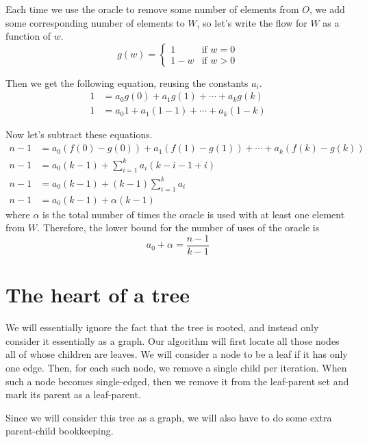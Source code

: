 \documentclass{article}
\begin{document}
\begin{description}
        Each time we use the oracle to remove some number of elements from $O$,
        we add some corresponding number of elements to $W$, so let's write the
        flow for $W$ as a function of $w$.
        $$
        g(w) = \begin{cases}
            1 & \text{if } w = 0 \\
            1 - w & \text{if } w > 0
        \end{cases}
        $$

        Then we get the following equation, reusing the constants $a_i$.
        \begin{align*}
            1 &= a_0 g(0) + a_1 g(1) + \cdots + a_k g(k) \\
            1 &= a_0 1 + a_1 (1 - 1) + \cdots + a_k (1 - k)
        \end{align*}

        Now let's subtract these equations.
        \begin{align*}
            n - 1 &= a_0 \left(f(0) - g(0)\right) + a_1 \left(f(1) - g(1)\right) + \cdots + a_k \left(f(k) - g(k)\right) \\
            n - 1 &= a_0 \left(k - 1\right) + \sum_{i=1}^k a_i \left(k - i - 1 + i\right) \\
            n - 1 &= a_0 \left(k - 1\right) + (k-1) \sum_{i=1}^k a_i \\
            n - 1 &= a_0 (k - 1) + \alpha (k - 1)
        \end{align*}
        where $\alpha$ is the total number of times the oracle is used with at
        least one element from $W$.
        Therefore, the lower bound for the number of uses of the oracle is
        $$ a_0 + \alpha = \frac{n - 1}{k - 1} $$
\end{description}

\section{The heart of a tree}

We will essentially ignore the fact that the tree is rooted, and instead only
consider it essentially as a graph. Our algorithm will first locate all those
nodes all of whose children are leaves. We will consider a node to be a leaf if
it has only one edge. Then, for each such node, we remove a single child per
iteration. When such a node becomes single-edged, then we remove it from the
leaf-parent set and mark its parent as a leaf-parent.

Since we will consider this tree as a graph, we will also have to do some extra
parent-child bookkeeping.
\end{document}
